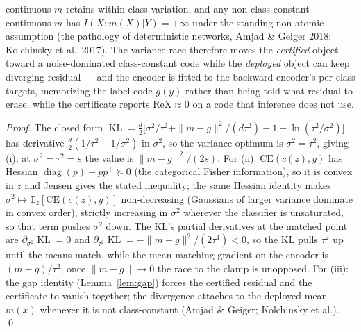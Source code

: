 \begin{proposition}
\begin{enumerate}
continuous $m$ retains within-class variation, and any non-class-constant continuous
$m$ has $I(X;m(X)|Y) = +\infty$ under the standing non-atomic assumption (the
pathology of deterministic networks, Amjad \&
Geiger 2018; Kolchinsky et al.\ 2017). The variance race therefore moves the
\emph{certified} object toward a noise-dominated class-constant code while the
\emph{deployed} object can keep diverging residual --- and the encoder is fitted to the
backward encoder's per-class targets, memorizing the label code $g(y)$ rather than
being told what residual to erase, while the certificate reports $\mathrm{ReX} \approx
0$ on a code that inference does not use.
\end{enumerate}
\end{proposition}

\begin{proof}
The closed form
$\operatorname{KL} = \tfrac{d}{2}\big[\sigma^2/\tau^2 + \|m-g\|^2/(d\tau^2)
- 1 + \ln(\tau^2/\sigma^2)\big]$ has derivative $\tfrac{d}{2}(1/\tau^2 - 1/\sigma^2)$
in $\sigma^2$, so the variance optimum is $\sigma^2 = \tau^2$, giving (i); at
$\sigma^2 = \tau^2 = s$ the value is $\|m-g\|^2/(2s)$. For (ii): $\mathrm{CE}(c(z), y)$ has Hessian
$\operatorname{diag}(p) - pp^{\top} \succeq 0$ (the categorical Fisher information), so
it is convex in $z$ and Jensen gives the stated inequality; the same Hessian identity makes
$\sigma^2 \mapsto \mathbb{E}_z[\mathrm{CE}(c(z),y)]$ non-decreasing (Gaussians of larger
variance dominate in convex order), strictly increasing in $\sigma^2$ wherever the
classifier is unsaturated, so that term pushes $\sigma^2$ down. The KL's partial derivatives at the
matched point are $\partial_{\sigma^2}\operatorname{KL} = 0$ and
$\partial_{\tau^2}\operatorname{KL} = -\|m-g\|^2/(2\tau^4) < 0$, so the KL pulls
$\tau^2$ up until the means match, while the mean-matching gradient on the encoder is
$(m - g)/\tau^2$; once $\|m-g\| \to 0$ the race to the clamp is unopposed. For (iii): the
gap identity (Lemma~\ref{lem:gap}) forces the certified residual and the certificate to
vanish together; the divergence attaches to the deployed mean $m(x)$ whenever it is not
class-constant (Amjad \& Geiger; Kolchinsky et al.). \hfill\qed
\end{proof}

